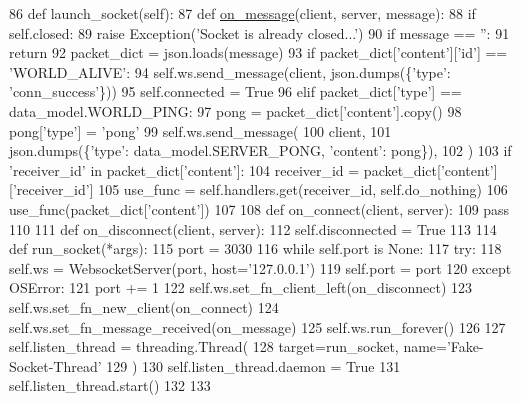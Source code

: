 \begin{DoxyCode}
86     \textcolor{keyword}{def }launch\_socket(self):
87         \textcolor{keyword}{def }\hyperlink{namespaceparlai_1_1chat__service_1_1services_1_1terminal__chat_1_1client_a0ef2bb2bd3b966dcdd8402a92b999708}{on\_message}(client, server, message):
88             \textcolor{keywordflow}{if} self.closed:
89                 \textcolor{keywordflow}{raise} Exception(\textcolor{stringliteral}{'Socket is already closed...'})
90             \textcolor{keywordflow}{if} message == \textcolor{stringliteral}{''}:
91                 \textcolor{keywordflow}{return}
92             packet\_dict = json.loads(message)
93             \textcolor{keywordflow}{if} packet\_dict[\textcolor{stringliteral}{'content'}][\textcolor{stringliteral}{'id'}] == \textcolor{stringliteral}{'WORLD\_ALIVE'}:
94                 self.ws.send\_message(client, json.dumps(\{\textcolor{stringliteral}{'type'}: \textcolor{stringliteral}{'conn\_success'}\}))
95                 self.connected = \textcolor{keyword}{True}
96             \textcolor{keywordflow}{elif} packet\_dict[\textcolor{stringliteral}{'type'}] == data\_model.WORLD\_PING:
97                 pong = packet\_dict[\textcolor{stringliteral}{'content'}].copy()
98                 pong[\textcolor{stringliteral}{'type'}] = \textcolor{stringliteral}{'pong'}
99                 self.ws.send\_message(
100                     client,
101                     json.dumps(\{\textcolor{stringliteral}{'type'}: data\_model.SERVER\_PONG, \textcolor{stringliteral}{'content'}: pong\}),
102                 )
103             \textcolor{keywordflow}{if} \textcolor{stringliteral}{'receiver\_id'} \textcolor{keywordflow}{in} packet\_dict[\textcolor{stringliteral}{'content'}]:
104                 receiver\_id = packet\_dict[\textcolor{stringliteral}{'content'}][\textcolor{stringliteral}{'receiver\_id'}]
105                 use\_func = self.handlers.get(receiver\_id, self.do\_nothing)
106                 use\_func(packet\_dict[\textcolor{stringliteral}{'content'}])
107 
108         \textcolor{keyword}{def }on\_connect(client, server):
109             \textcolor{keywordflow}{pass}
110 
111         \textcolor{keyword}{def }on\_disconnect(client, server):
112             self.disconnected = \textcolor{keyword}{True}
113 
114         \textcolor{keyword}{def }run\_socket(*args):
115             port = 3030
116             \textcolor{keywordflow}{while} self.port \textcolor{keywordflow}{is} \textcolor{keywordtype}{None}:
117                 \textcolor{keywordflow}{try}:
118                     self.ws = WebsocketServer(port, host=\textcolor{stringliteral}{'127.0.0.1'})
119                     self.port = port
120                 \textcolor{keywordflow}{except} OSError:
121                     port += 1
122             self.ws.set\_fn\_client\_left(on\_disconnect)
123             self.ws.set\_fn\_new\_client(on\_connect)
124             self.ws.set\_fn\_message\_received(on\_message)
125             self.ws.run\_forever()
126 
127         self.listen\_thread = threading.Thread(
128             target=run\_socket, name=\textcolor{stringliteral}{'Fake-Socket-Thread'}
129         )
130         self.listen\_thread.daemon = \textcolor{keyword}{True}
131         self.listen\_thread.start()
132 
133 
\end{DoxyCode}
